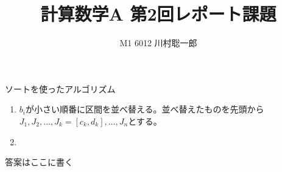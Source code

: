 \documentclass[dvipdfmx]{jsreport}
\title{計算数学A 第2回レポート課題}
\author{M1 6012 川村聡一郎}
\date{}
\begin{document}
\maketitle

\begin{tcolorbox}
\begin{tcolorbox}
	ソートを使ったアルゴリズム
\begin{enumerate}
	\item $b_i$が小さい順番に区間を並べ替える。並べ替えたものを先頭から$J_1, J_2, \ldots, J_k= [c_k, d_k], \ldots, J_n$とする。
	\item 
\end{enumerate}
\end{tcolorbox}
\end{tcolorbox}

\begin{souanswer} %
	答案はここに書く
\end{souanswer}
\end{document}
